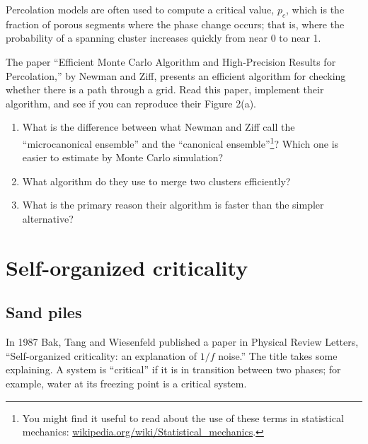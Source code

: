 \documentclass[10pt]{book}
\begin{document}
Percolation models are often used to compute a critical value,
$p_c$, which is the fraction of porous segments where the phase
change occurs; that is, where the probability of a spanning cluster
increases quickly from near 0 to near 1.

\begin{ex}

The paper ``Efficient Monte Carlo Algorithm and High-Precision Results
for Percolation,'' by Newman and Ziff, presents an efficient algorithm
for checking whether there is a path through a grid.  Read this
paper, implement their algorithm, and see if you can reproduce their
Figure 2(a).

\begin{enumerate}

\item What is the difference between what Newman and Ziff call the
  ``microcanonical ensemble'' and the ``canonical
  ensemble''\footnote{You might find it useful to read about the use of
    these terms in statistical mechanics:
    \url{wikipedia.org/wiki/Statistical_mechanics}.}?  Which one is
  easier to estimate by Monte Carlo simulation?

\item What algorithm do they use to merge two clusters efficiently? 

\item What is the primary reason their algorithm is faster than the
  simpler alternative?

\end{enumerate}
 
\end{ex}




\chapter{Self-organized criticality}

\section{Sand piles}

In 1987 Bak, Tang and Wiesenfeld published a paper in Physical Review
Letters, ``Self-organized criticality: an explanation of $1/f$ noise.''
The title takes some explaining.  A system is ``critical'' if it is
in transition between two phases; for example, water at
its freezing point is a critical system.
\end{document}
